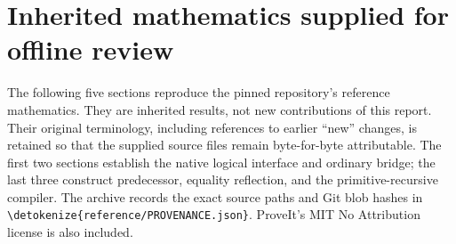 \documentclass[11pt,letterpaper]{article}
\theoremstyle{definition}\newtheorem{definition}[theorem]{Definition}
\theoremstyle{remark}\newtheorem{remark}[theorem]{Remark}
\newcommand{\file}[1]{\expandafter\nolinkurl\expandafter{\detokenize{#1}}}
\begin{document}
\clearpage
\appendix
\section*{Inherited mathematics supplied for offline review}
The following five sections reproduce the pinned repository's reference
mathematics. They are inherited results, not new contributions of this
report. Their original terminology, including references to earlier
``new'' changes, is retained so that the supplied source files remain
byte-for-byte attributable. The first two sections establish the native
logical interface and ordinary bridge; the last three construct
predecessor, equality reflection, and the primitive-recursive compiler.
The archive records the exact source paths and Git blob hashes in
\file{reference/PROVENANCE.json}. ProveIt's MIT No Attribution license is
also included.






\end{document}
